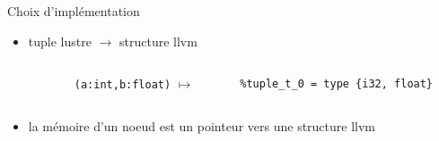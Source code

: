 \documentclass{beamer} %
\newcommand{\ocaml}[1]{\texttt{#1}}
\begin{document}
\begin{frame}[fragile]{Choix d'implémentation}
    \begin{itemize}
        \vfill \item tuple lustre $\to$ structure llvm \\


            \begin{columns}

                \begin{column}{0.1\textwidth}
                \end{column}
                \begin{column}{0.3\textwidth}

                    \ocaml{(a:int,b:float)} $\mapsto$
                \end{column}
                \begin{column}{0.6\textwidth}  %
                        \begin{verbatim}
%tuple_t_0 = type {i32, float}
                        \end{verbatim}
                \end{column}
            \end{columns}

        \vfill \item la mémoire d'un noeud est un pointeur vers une structure llvm
    \end{itemize}
    \vfill
\end{frame}
\end{document}
